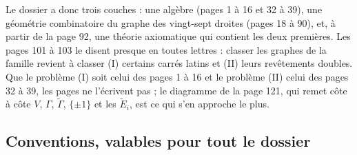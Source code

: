 \documentclass[11pt,a4paper]{article}
\begin{document}
Le dossier a donc trois couches : une algèbre (pages 1 à 16 et 32 à 39), une
géométrie combinatoire du graphe des vingt-sept droites (pages 18 à 90), et, à
partir de la page 92, une théorie axiomatique qui contient les deux premières.
Les pages 101 à 103 le disent presque en toutes lettres : classer les graphes
de la famille revient à classer (I) certains carrés latins et (II) leurs
revêtements doubles. Que le problème (I) soit celui des pages 1 à 16 et le
problème (II) celui des pages 32 à 39, les pages ne l'écrivent pas ; le
diagramme de la page 121, qui remet côte à côte $V$, $\Gamma$,
$\widetilde\Gamma$, $\lbrace \pm 1\rbrace$ et les $\widetilde E_i$, est ce qui
s'en approche le plus.

\subsection*{Conventions, valables pour tout le dossier}
\end{document}
